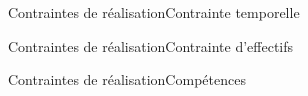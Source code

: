 \begin{frame}{Contraintes de réalisation}{Contrainte temporelle}

\end{frame}

\begin{frame}{Contraintes de réalisation}{Contrainte d'effectifs}

\end{frame}

\begin{frame}{Contraintes de réalisation}{Compétences}

\end{frame}